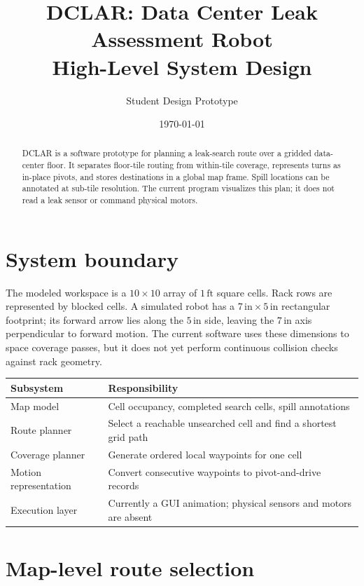 \documentclass[11pt]{article}
\title{DCLAR: Data Center Leak Assessment Robot\\High-Level System Design}
\author{Student Design Prototype}
\date{\today}
\begin{document}
\maketitle

\begin{abstract}
DCLAR is a software prototype for planning a leak-search route over a gridded
data-center floor. It separates floor-tile routing from within-tile coverage,
represents turns as in-place pivots, and stores destinations in a global map
frame. Spill locations can be annotated at sub-tile resolution. The current
program visualizes this plan; it does not read a leak sensor or command physical
motors.
\end{abstract}

\section{System boundary}

The modeled workspace is a $10\times10$ array of $1\,\mathrm{ft}$ square
cells. Rack rows are represented by blocked cells. A simulated robot has a
$7\,\mathrm{in}\times5\,\mathrm{in}$ rectangular footprint; its forward arrow
lies along the $5\,\mathrm{in}$ side, leaving the $7\,\mathrm{in}$ axis
perpendicular to forward motion. The current software uses these dimensions to
space coverage passes, but it does not yet perform continuous collision checks
against rack geometry.

\begin{center}
\begin{tabular}{ll}
\toprule
Subsystem & Responsibility \\
\midrule
Map model & Cell occupancy, completed search cells, spill annotations \\
Route planner & Select a reachable unsearched cell and find a shortest grid path \\
Coverage planner & Generate ordered local waypoints for one cell \\
Motion representation & Convert consecutive waypoints to pivot-and-drive records \\
Execution layer & Currently a GUI animation; physical sensors and motors are absent \\
\bottomrule
\end{tabular}
\end{center}

\section{Map-level route selection}
\end{document}
